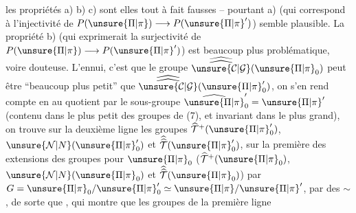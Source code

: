 
 les propriétés a) b) c) sont elles
tout à fait fausses -- pourtant a) (qui correspond à l'injectivité de
$P(\unsure{\Pi|\pi})\longrightarrow P(\unsure{\Pi|\pi}')$) semble  plausible.
La propriété b) (qui exprimerait la surjectivité de
$P(\unsure{\Pi|\pi})\longrightarrow P(\unsure{\Pi|\pi}')$) est beaucoup plus problématique,
voire douteuse. L'ennui, c'est que le groupe
$\widehat{\widehat{\unsure{\mathcal C|\mathcal G}}}(\unsure{\Pi|\pi}_0)$
peut être ``beaucoup plus petit'' que
$\widehat{\widehat{\unsure{\mathcal C|\mathcal G}}}(\unsure{\Pi|\pi}'_0)$,
on s'en rend compte en  au quotient par le sous-groupe
$\widehat{\unsure{\Pi|\pi}}'_0=\unsure{\Pi|\pi}'$ (contenu dans le plus petit des groupes de (7),
et invariant dans le plus grand), on trouve sur la deuxième ligne
les groupes $\widehat{\mathcal T}^{+}(\unsure{\Pi|\pi}'_0)$,
 $\unsure{\mathcal N|N}(\unsure{\Pi|\pi}'_0)$ et
$\widehat{\widehat{\mathcal T}}(\unsure{\Pi|\pi}'_0)$, sur la première
des extensions des groupes 
pour $\unsure{\Pi|\pi}_0$ ($\widehat{\mathcal T}^{+}(\unsure{\Pi|\pi}_0)$,
$\unsure{\mathcal N|N}(\unsure{\Pi|\pi}_0)$ et
$\widehat{\widehat{\mathcal T}}(\unsure{\Pi|\pi}_0)$) par
 $G=\unsure{\Pi|\pi}_0/\unsure{\Pi|\pi}'_0\simeq\unsure{\Pi|\pi}/\unsure{\Pi|\pi}'$,
 par des $\sim$, de sorte que 
,
qui montre que les groupes de la première ligne
